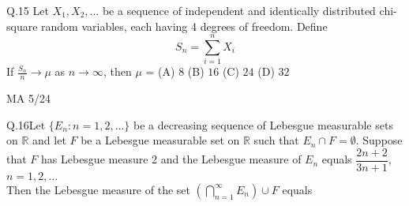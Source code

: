 \documentclass{article}
\begin{document}
																									    Q.15 \quad Let $X_1, X_2, \dots$ be a sequence of independent and identically distributed chi-square random variables, each having 4 degrees of freedom. Define
																									    \[
																									    S_n = \sum_{i=1}^n X_i
																									    \]
																									    If $\frac{S_n}{n} \to \mu$ as $n \to \infty$, then $\mu$ =
																									    \vspace{1em}
																									    \newline 
																									    \noindent (A) $8$ \hspace{2cm} (B) $16$ \hspace{2cm}(C) $24$ \hspace{2cm} (D) $32$
																									    \vspace{15em}
																									    \begin{center}
																									        {MA 5/24}
																										\end{center}
																										\newpage
																										Q.16\quad Let $\{E_n : n = 1, 2, \dots\}$ be a decreasing sequence of Lebesgue measurable sets on $\mathbb{R}$ and let $F$ be a Lebesgue measurable set on $\mathbb{R}$ such that $E_n \cap F = \emptyset$. Suppose that $F$ has Lebesgue measure 2 and the Lebesgue measure of $E_n$ equals $\dfrac{2n + 2}{3n + 1}$, $n = 1, 2, \dots$\\
																										\vspace{1.5em}
																										Then the Lebesgue measure of the set $\left(\bigcap_{n=1}^{\infty} E_n\right) \cup F$ equals
\end{document}
